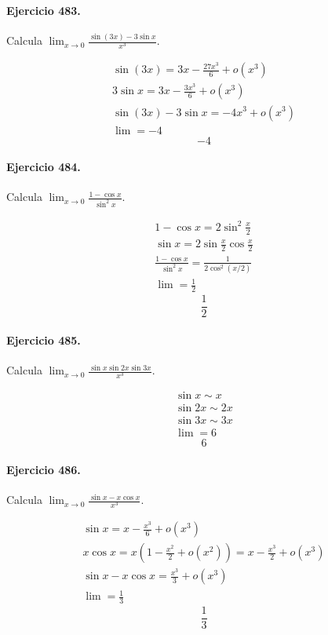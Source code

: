 \documentclass[11pt,a4paper]{article}
\begin{document}
\paragraph{Ejercicio 483.} Calcula $\displaystyle \lim_{x\to0}\frac{\sin(3x)-3\sin x}{x^3}$.

\[
\begin{aligned}
\sin(3x)=3x-\frac{27x^3}{6}+o(x^3)\\
3\sin x=3x-\frac{3x^3}{6}+o(x^3)\\
\sin(3x)-3\sin x=-4x^3+o(x^3)\\
\lim=-4
\end{aligned}
\]
\[\boxed{-4}\]


\paragraph{Ejercicio 484.} Calcula $\displaystyle \lim_{x\to0}\frac{1-\cos x}{\sin^2x}$.

\[
\begin{aligned}
1-\cos x=2\sin^2\frac{x}{2}\\
\sin x=2\sin\frac{x}{2}\cos\frac{x}{2}\\
\frac{1-\cos x}{\sin^2x}=\frac{1}{2\cos^2(x/2)}\\
\lim=\frac12
\end{aligned}
\]
\[\boxed{\frac12}\]


\paragraph{Ejercicio 485.} Calcula $\displaystyle \lim_{x\to0}\frac{\sin x\sin2x\sin3x}{x^3}$.

\[
\begin{aligned}
\sin x\sim x\\
\sin2x\sim2x\\
\sin3x\sim3x\\
\lim=6
\end{aligned}
\]
\[\boxed{6}\]


\paragraph{Ejercicio 486.} Calcula $\displaystyle \lim_{x\to0}\frac{\sin x-x\cos x}{x^3}$.

\[
\begin{aligned}
\sin x=x-\frac{x^3}{6}+o(x^3)\\
x\cos x=x\left(1-\frac{x^2}{2}+o(x^2)\right)=x-\frac{x^3}{2}+o(x^3)\\
\sin x-x\cos x=\frac{x^3}{3}+o(x^3)\\
\lim=\frac13
\end{aligned}
\]
\[\boxed{\frac13}\]
\end{document}

